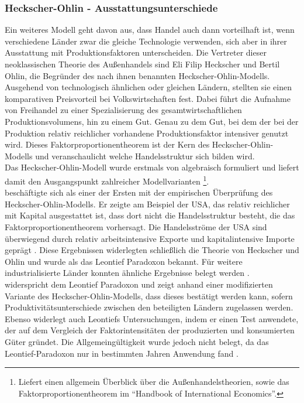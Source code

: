 \subsubsection{Heckscher-Ohlin - Ausstattungsunterschiede}
Ein weiteres Modell geht davon aus, dass Handel auch dann vorteilhaft ist, wenn verschiedene Länder zwar die gleiche Technologie verwenden, sich aber in ihrer Ausstattung mit Produktionsfaktoren unterscheiden. Die Vertreter dieser neoklassischen Theorie des Au{\ss}enhandels sind Eli Filip Heckscher und Bertil Ohlin, die Begr{\"u}nder des nach ihnen benannten Heckscher-Ohlin-Modells. Ausgehend von technologisch {\"a}hnlichen oder gleichen L{\"a}ndern, stellten sie einen komparativen Preisvorteil bei Volkswirtschaften fest. Dabei führt die Aufnahme von Freihandel zu einer Spezialisierung des gesamtwirtschaftlichen Produktionsvolumens, hin zu einem Gut. Genau zu dem Gut, bei dem der bei der Produktion relativ reichlicher vorhandene Produktionsfaktor intensiver genutzt wird. Dieses Faktorproportionentheorem ist der Kern des Heckscher-Ohlin-Modells und veranschaulicht welche Handelsstruktur sich bilden wird.\\
Das Heckscher-Ohlin-Modell wurde erstmals von \citet{Jones.1965} algebraisch formuliert und liefert damit den Ausgangspunkt zahlreicher Modellvarianten \citep{Davis.2001,Trefler.1993,Deardorff.1984,Jones.1984}\footnote{Liefert einen allgemein Überblick über die Au{\ss}enhandelstheorien, sowie das Faktorproportionentheorem im "`Handbook of International Economics"'.}.\\


\citet{Leontief.1953} besch{\"a}ftigte sich als einer der Ersten mit der empirischen {\"U}berpr{\"u}fung des Heckscher-Ohlin-Modells. Er zeigte am Beispiel der USA, das relativ reichlicher mit Kapital ausgestattet ist, dass dort nicht die Handelsstruktur besteht, die das Faktorproportionentheorem vorhersagt.  Die Handelsstr{\"o}me der USA sind {\"u}berwiegend durch relativ arbeitsintensive Exporte und kapitalintensive Importe gepr{\"a}gt \citep{Leontief.1953}. Diese Ergebnissen widerlegten schlie{\ss}lich die Theorie von Heckscher und Ohlin und wurde als das Leontief Paradoxon bekannt. Für weitere industrialisierte L{\"a}nder konnten {\"a}hnliche Ergebnisse belegt werden \citep{Gruber.1970,Maskus.1985}.\\


\citet{Trefler.1993} widerspricht dem Leontief Paradoxon und zeigt anhand einer modifizierten Variante des Heckscher-Ohlin-Modells, dass dieses best{\"a}tigt werden kann, sofern Produktivit{\"a}tsunterschiede zwischen den beteiligten L{\"a}ndern zugelassen werden. Ebenso widerlegt auch \citet{Leamer.1980} Leontiefs Untersuchungen, indem er einen Test anwendete, der auf dem Vergleich der Faktorintensit{\"a}ten der produzierten und konsumierten G{\"u}ter gr{\"u}ndet. Die Allgemeingültigkeit wurde jedoch nicht belegt, da das Leontief-Paradoxon nur in bestimmten Jahren Anwendung fand \citep{Stern.1981}.\\


